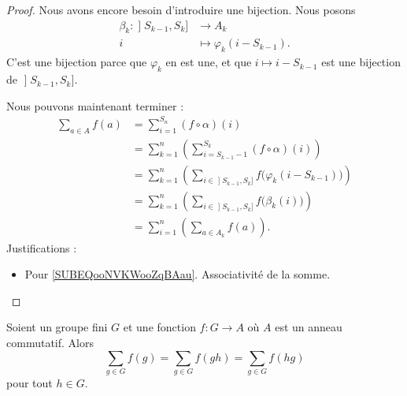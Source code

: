 \begin{proof}
	Nous avons encore besoin d'introduire une bijection. Nous posons
	\begin{equation}
		\begin{aligned}
			\beta_k\colon \mathopen] S_{k-1} , S_k \mathclose] & \to A_k                       \\
			i                                                  & \mapsto \varphi_k(i-S_{k-1}).
		\end{aligned}
	\end{equation}
	C'est une bijection parce que \( \varphi_k\) en est une, et que \( i\mapsto i-S_{k-1}\) est une bijection de \( \mathopen] S_{k-1} , S_k \mathclose]\).

	Nous pouvons maintenant terminer :
	\begin{subequations}
		\begin{align}
			\sum_{a\in A}f(a) & =\sum_{i=1}^{S_n}(f\circ \alpha)(i)                                                                            \\
			                  & =\sum_{k=1}^n\left( \sum_{i=S_{k-1}-1}^{S_k}(f\circ \alpha)(i) \right)        \label{SUBEQooNVKWooZqBAau}      \\
			                  & =\sum_{k=1}^n\left( \sum_{i\in \mathopen] S_{k-1} , S_k \mathclose]}f\big( \varphi_k(i-S_{k-1}) \big)  \right) \\
			                  & =\sum_{k=1}^n\left( \sum_{i\in \mathopen] S_{k-1} , S_k \mathclose]}f\big( \beta_k(i) \big) \right)            \\
			                  & =\sum_{i=1}^n\left( \sum_{a\in A_k}f(a) \right).
		\end{align}
	\end{subequations}
	Justifications :
	\begin{itemize}
		\item Pour \eqref{SUBEQooNVKWooZqBAau}. Associativité de la somme.
	\end{itemize}
\end{proof}


\begin{proposition}     \label{PROPooWJQQooFINSEc}
	Soient un groupe fini \( G\) et une fonction \( f\colon G\to A\) où \( A\) est un anneau commutatif. Alors
	\begin{equation}
		\sum_{g\in G}f(g)=\sum_{g\in G}f(gh)=\sum_{g\in G}f(hg)
	\end{equation}
	pour tout \( h\in G\).
\end{proposition}

